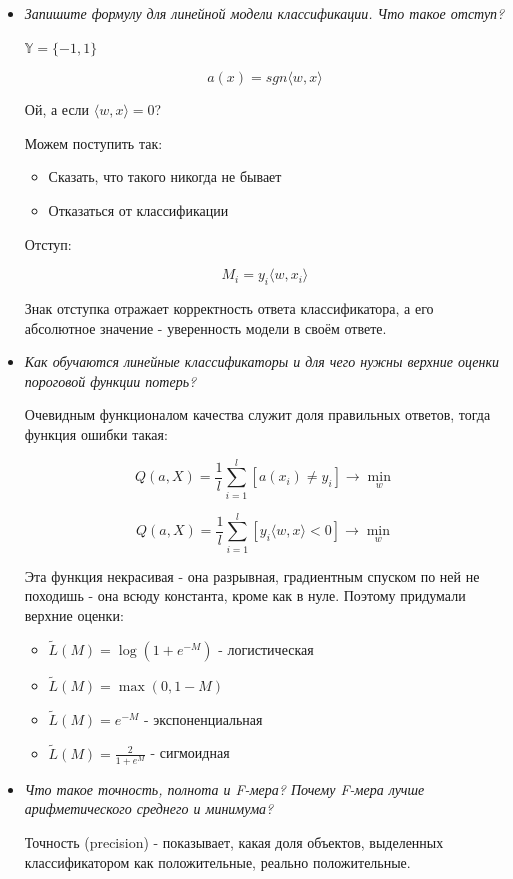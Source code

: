 \documentclass[a4paper]{article}
\begin{document}
\begin{itemize}

\item \textit{Запишите формулу для линейной модели классификации. Что такое отступ?}

$\mathbb{Y} = \{ -1, 1 \}$

\[ a(x) = sgn \langle w, x \rangle \]

Ой, а если $\langle w, x \rangle = 0$?

Можем поступить так:
\begin{itemize}
\item Сказать, что такого никогда не бывает
\item Отказаться от классификации
\end{itemize}

Отступ:

\[ M_i = y_i \langle w, x_i \rangle \]

Знак отступка отражает корректность ответа классификатора, а его абсолютное значение - уверенность модели в своём ответе.

\item \textit{Как обучаются линейные классификаторы и для чего нужны верхние оценки пороговой функции потерь?}

Очевидным функционалом качества служит доля правильных ответов, тогда функция ошибки такая:

\[  Q(a, X) = \frac{1}{l} \sum_{i=1}^l [a(x_i) \neq y_i] \rightarrow \min_w \]

\[ Q(a, X) = \frac{1}{l} \sum_{i=1}^l [y_i \langle w, x \rangle < 0] \rightarrow \min_w \]

Эта функция некрасивая - она разрывная, градиентным спуском по ней не походишь - она всюду константа, кроме как в нуле. Поэтому придумали верхние оценки:

\begin{itemize}
\item $ \widetilde{L}(M) = \log (1+e^{-M}) $ - логистическая
\item $ \widetilde{L}(M) = \max(0, 1-M)$
\item $ \widetilde{L}(M) = e^{-M}$ - экспоненциальная
\item $ \widetilde{L}(M) = \frac{2}{1+e^M}$ - сигмоидная
\end{itemize}

\item \textit{Что такое точность, полнота и F-мера? Почему F-мера лучше арифметического среднего и минимума?}

Точность (precision) - показывает, какая доля объектов, выделенных классификатором как положительные, реально положительные.


\end{itemize}
\end{document}
